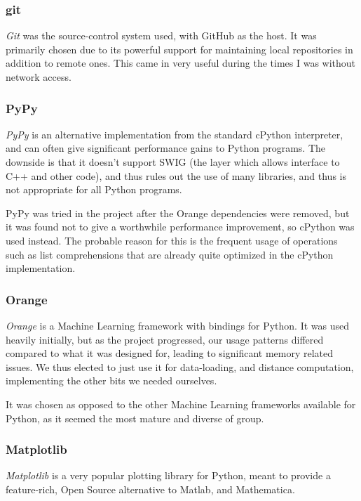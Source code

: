 \documentclass[a4paper,11pt]{report}
\begin{document}
\subsubsection*{git}
\emph{Git} \citep{prog:git} was the source-control system used, with GitHub as the host. It was primarily chosen due to its powerful support for maintaining local repositories in addition to remote ones. This came in very useful during the times I was without network access.

\subsubsection*{PyPy}
\emph{PyPy} \citep{prog:pypy} is an alternative implementation from the standard cPython interpreter, and can often give significant performance gains to Python programs. The downside is that it doesn't support SWIG (the layer which allows interface to C++ and other code), and thus rules out the use of many libraries, and thus is not appropriate for all Python programs.

PyPy was tried in the project after the Orange dependencies were removed, but it was found not to give a worthwhile performance improvement, so cPython was used instead. The probable reason for this is the frequent usage of operations such as list comprehensions that are already quite optimized in the cPython implementation.

\subsubsection*{Orange}
\emph{Orange} \citep{prog:orange} is a Machine Learning framework with bindings for Python. It was used heavily initially, but as the project progressed, our usage patterns differed compared to what it was designed for, leading to significant memory related issues. We thus elected to just use it for data-loading, and distance computation, implementing the other bits we needed ourselves.

It was chosen as opposed to the other Machine Learning frameworks available for Python, as it seemed the most mature and diverse of group.

\subsubsection*{Matplotlib}
\emph{Matplotlib} \citep{prog:matplotlib} is a very popular plotting library for Python, meant to provide a feature-rich, Open Source alternative to Matlab, and Mathematica.
\end{document}
